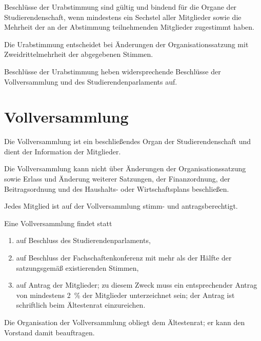 \begin{contract}
Beschlüsse der Urabstimmung sind gültig und bindend für die Organe der Studierendenschaft, wenn mindestens ein Sechstel aller Mitglieder sowie die Mehrheit der an der Abstimmung teilnehmenden Mitglieder zugestimmt haben. 

Die Urabstimmung entscheidet bei Änderungen der Organisationssatzung mit Zweidrittelmehrheit der abgegebenen Stimmen. 

Beschlüsse der Urabstimmung heben widersprechende Beschlüsse der Vollversammlung und des Studierendenparlaments auf.

%
%

\parnumberfalse \section{Vollversammlung} \parnumbertrue


Die Vollversammlung ist ein beschließendes Organ der Studierendenschaft und dient der Information der Mitglieder. 

Die Vollversammlung kann nicht über Änderungen der Organisationssatzung sowie Erlass und Änderung weiterer Satzungen, der Finanzordnung, der Beitragsordnung und des Haushalts- oder Wirtschaftsplans beschließen.


\parnumberfalse Jedes Mitglied ist auf der Vollversammlung stimm- und antragsberechtigt.\parnumbertrue

 \label{vv:zustandekommen}

\parnumberfalse Eine Vollversammlung findet statt
\begin{enumerate}
\item auf Beschluss des Studierendenparlaments,
\item auf Beschluss der Fachschaftenkonferenz mit mehr als der Hälfte der satzungsgemäß existierenden Stimmen,
\item \label{vv:zustandekommen:mitglieder}auf Antrag der Mitglieder; zu diesem Zweck muss ein entsprechender Antrag von mindestens 2~\% der Mitglieder unterzeichnet sein; der Antrag ist schriftlich beim Ältestenrat einzureichen.
\end{enumerate} \parnumbertrue


\label{vv:organisation}

Die Organisation der Vollversammlung obliegt dem Ältestenrat; er kann den Vorstand damit beauftragen.


\end{contract}
